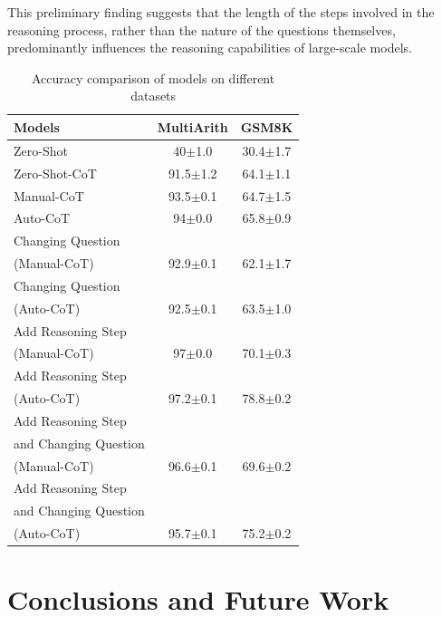 \documentclass[11pt]{article}
\begin{document}
This preliminary finding suggests that the length of the steps involved in the reasoning process, rather than the nature of the questions themselves, predominantly influences the reasoning capabilities of large-scale models.

\begin{table}[t]
\small
\centering

\caption{Accuracy comparison of models on different datasets}

\begin{tabular}{lcc}
\toprule
Models & MultiArith & GSM8K \\
\midrule
Zero-Shot & 40$\pm$1.0 & 30.4$\pm$1.7 \\
Zero-Shot-CoT & 91.5$\pm$1.2 & 64.1$\pm$1.1 \\
Manual-CoT & 93.5$\pm$0.1 & 64.7$\pm$1.5 \\
Auto-CoT & 94$\pm$0.0 & 65.8$\pm$0.9 \\
\hline %
Changing Question \\(Manual-CoT) & 92.9$\pm$0.1 & 62.1$\pm$1.7 \\
Changing Question \\(Auto-CoT) & 92.5$\pm$0.1 & 63.5$\pm$1.0 \\
\hline
Add Reasoning Step \\(Manual-CoT) & 97$\pm$0.0 & 70.1$\pm$0.3 \\
Add Reasoning Step \\(Auto-CoT) & 97.2$\pm$0.1 & 78.8$\pm$0.2 \\
\hline
Add Reasoning Step \\and Changing Question\\(Manual-CoT) & 96.6$\pm$0.1 & 69.6$\pm$0.2 \\
Add Reasoning Step \\and Changing Question\\(Auto-CoT) & 95.7$\pm$0.1 & 75.2$\pm$0.2 \\
\bottomrule
\end{tabular}

%
\label{tab:case1}

\end{table}


\phantom{Invisible Text}
\vspace{-\baselineskip}

\section{Conclusions and Future Work}
\end{document}
